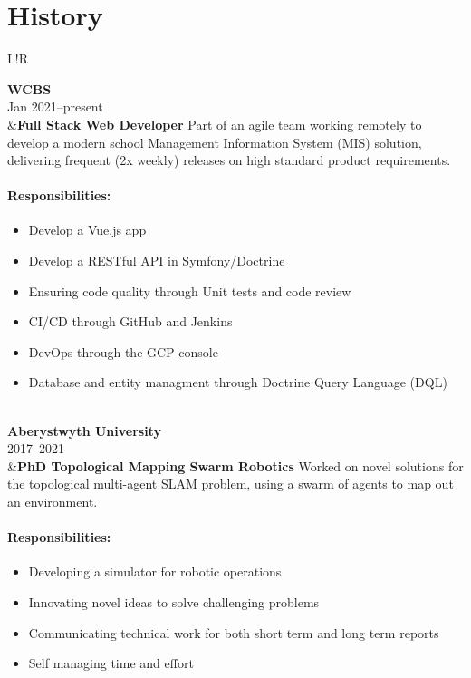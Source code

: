 \documentclass[10pt]{article}
\newcommand\VRule{\color{lightgray}\vrule width 0.5pt}
\begin{document}
\section*{History}
\begin{longtable}{L!{\VRule}R}

{\bf WCBS}\\
Jan 2021--present\\
&{\bf Full Stack Web Developer}\newline
Part of an agile team working remotely to develop a modern school Management Information System (MIS) solution, delivering frequent (2x weekly) releases on high standard product requirements.

\vspace{-3mm}
\paragraph{Responsibilities:}
\begin{itemize}[noitemsep,topsep=0pt]
	\item Develop a Vue.js app
	\item Develop a RESTful API in Symfony/Doctrine
	\item Ensuring code quality through Unit tests and code review
	\item CI/CD through GitHub and Jenkins
	\item DevOps through the GCP console
	\item Database and entity managment through Doctrine Query Language (DQL)
\end{itemize}
\\

{\bf Aberystwyth University}\\
2017--2021\\
&{\bf PhD Topological Mapping Swarm Robotics}\newline
Worked on novel solutions for the topological multi-agent SLAM problem, using a swarm of agents to map out an environment.

\vspace{-3mm}
\paragraph{Responsibilities:}
\begin{itemize}[noitemsep,topsep=0pt]
	\item Developing a simulator for robotic operations
	\item Innovating novel ideas to solve challenging problems
	\item Communicating technical work for both short term and long term reports
	\item Self managing time and effort
\end{itemize}
\\


\end{longtable}
\end{document}
